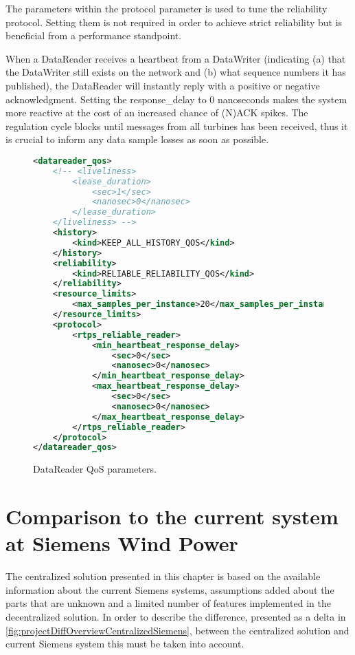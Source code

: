 \begin{itemize}
	The parameters within the protocol parameter is used to tune the reliability protocol. Setting them is not required in order to achieve strict reliability but is beneficial from a performance standpoint. 
	
	When a DataReader receives a heartbeat from a DataWriter (indicating (a) that the DataWriter still exists on the network and (b) what sequence numbers it has published), the DataReader will instantly reply with a positive or negative acknowledgment. Setting the response\_delay to 0 nanoseconds makes the system more reactive at the cost of an increased chance of (N)ACK spikes. The regulation cycle blocks until messages from all turbines has been received, thus it is crucial to inform any data sample losses as soon as possible.
\end{itemize}


\begin{figure}[!h]
\begin{lstlisting}[language=XML]
<datareader_qos>
	<!-- <liveliness>
		<lease_duration>
			<sec>1</sec>
			<nanosec>0</nanosec>
		</lease_duration>
	</liveliness> -->
	<history>
		<kind>KEEP_ALL_HISTORY_QOS</kind>
	</history>
	<reliability>
		<kind>RELIABLE_RELIABILITY_QOS</kind>
	</reliability>
	<resource_limits>
		<max_samples_per_instance>20</max_samples_per_instance>
	</resource_limits>
	<protocol>
		<rtps_reliable_reader>
			<min_heartbeat_response_delay>
				<sec>0</sec>
				<nanosec>0</nanosec>
			</min_heartbeat_response_delay>
			<max_heartbeat_response_delay>
				<sec>0</sec>
				<nanosec>0</nanosec>
			</max_heartbeat_response_delay>
		</rtps_reliable_reader>
	</protocol>
</datareader_qos>
\end{lstlisting}
\caption[DataReader QoS parameters]{
		\label{fig:readerQoS} 
		\footnotesize{DataReader QoS parameters.}
	}
\end{figure}

\FloatBarrier

\section{Comparison to the current system at Siemens Wind Power} \label{sec:CenAndCurrentSiemensSystemComparison}
The centralized solution presented in this chapter is based on the available information about the current Siemens systems, assumptions added about the parts that are unknown and a limited number of features implemented in the decentralized solution. In order to describe the difference, presented as a delta in \cref{fig:projectDiffOverviewCentralizedSiemens}, between the centralized solution and current Siemens system this must be taken into account.


